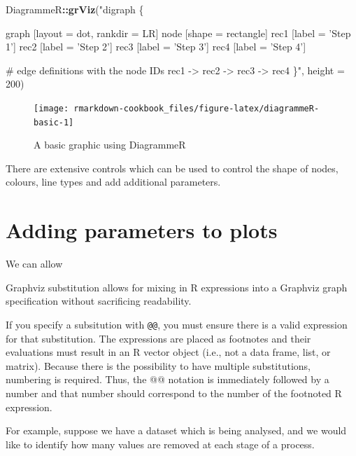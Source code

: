 \documentclass[]{book}
\newenvironment{Shaded}{\begin{snugshade}}{\end{snugshade}}
\newcommand{\KeywordTok}[1]{\textcolor[rgb]{0.13,0.29,0.53}{\textbf{#1}}}
\newcommand{\DataTypeTok}[1]{\textcolor[rgb]{0.13,0.29,0.53}{#1}}
\newcommand{\DecValTok}[1]{\textcolor[rgb]{0.00,0.00,0.81}{#1}}
\newcommand{\StringTok}[1]{\textcolor[rgb]{0.31,0.60,0.02}{#1}}
\newcommand{\OperatorTok}[1]{\textcolor[rgb]{0.81,0.36,0.00}{\textbf{#1}}}
\newcommand{\NormalTok}[1]{#1}
\begin{document}
\begin{Shaded}
\begin{Highlighting}[]
\NormalTok{DiagrammeR}\OperatorTok{::}\KeywordTok{grViz}\NormalTok{(}\StringTok{"digraph \{}

\StringTok{        graph [layout = dot, rankdir = LR]}
\StringTok{        }
\StringTok{        node [shape = rectangle]        }
\StringTok{        rec1 [label = 'Step 1']}
\StringTok{        rec2 [label = 'Step 2']}
\StringTok{        rec3 [label =  'Step 3']}
\StringTok{        rec4 [label = 'Step 4']}

\StringTok{        # edge definitions with the node IDs}
\StringTok{        rec1 -> rec2 -> rec3 -> rec4}
\StringTok{        \}"}\NormalTok{,}
        \DataTypeTok{height =} \DecValTok{200}\NormalTok{)}
\end{Highlighting}
\end{Shaded}

\begin{figure}

{\centering \texttt{[image: rmarkdown-cookbook\_files/figure-latex/diagrammeR-basic-1]} 

}

\caption{A basic graphic using DiagrammeR}\label{fig:diagrammeR-basic}
\end{figure}

There are extensive controls which can be used to control the shape of
nodes, colours, line types and add additional parameters.

\section{Adding parameters to plots}\label{adding-parameters-to-plots}

We can allow

Graphviz substitution allows for mixing in R expressions into a Graphviz
graph specification without sacrificing readability.

If you specify a subsitution with \texttt{@@}, you must ensure there is
a valid expression for that substitution. The expressions are placed as
footnotes and their evaluations must result in an R vector object (i.e.,
not a data frame, list, or matrix). Because there is the possibility to
have multiple substitutions, numbering is required. Thus, the @@
notation is immediately followed by a number and that number should
correspond to the number of the footnoted R expression.

For example, suppose we have a dataset which is being analysed, and we
would like to identify how many values are removed at each stage of a
process.
\end{document}
